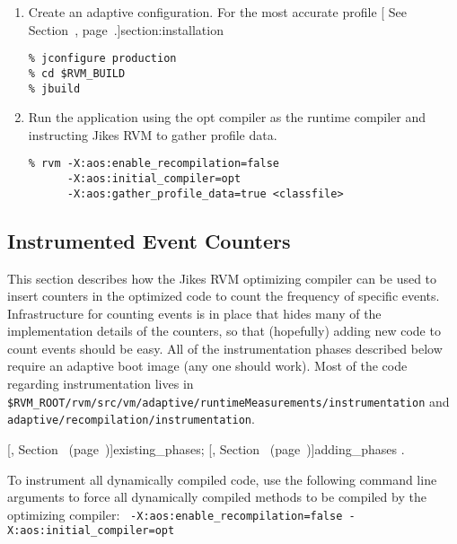 \begin{enumerate}
\item Create an adaptive configuration.  For the most accurate profile
[  See Section~\Ref, page~\Pageref.]{section:installation}
\begin{verbatim}
% jconfigure production
% cd $RVM_BUILD
% jbuild
\end{verbatim}

\item Run the application using the opt compiler as the runtime compiler and
instructing Jikes RVM to gather profile data.
\begin{verbatim}
% rvm -X:aos:enable_recompilation=false 
      -X:aos:initial_compiler=opt 
      -X:aos:gather_profile_data=true <classfile>
\end{verbatim}
\end{enumerate}

\subsection{Instrumented Event Counters}
\label{counting_events}
This section describes how the Jikes RVM optimizing compiler can be
used to insert counters in the optimized code to count the frequency
of specific events.  Infrastructure for counting events is in place
that hides many of the implementation details of the counters, so that
(hopefully) adding new code to count events should be easy.  All of
the instrumentation phases described below require an adaptive boot
image (any one should work).  Most of the code regarding
instrumentation lives in {\tt
\$RVM\_\-ROOT/rvm/src/vm/adaptive/runtimeMeasurements/instrumentation} and {\tt
adaptive/recompilation/instrumentation}.

[, Section~\Ref{} (page~\Pageref)]{existing_phases}; [, Section~\Ref{} (page~\Pageref)]{adding_phases}
.

To instrument all dynamically compiled code, use the following command
line arguments to force all dynamically compiled methods to be
compiled by the optimizing compiler: {\tt
-X:aos:en\-a\-ble\_re\-com\-pi\-la\-tion=false -X:aos:i\-ni\-tial\_com\-pi\-ler=opt}

